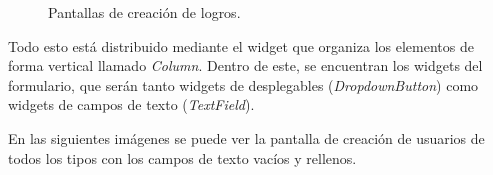 \begin{figure}[H]%
  \centering
  \qquad
  \caption{Pantallas de creación de logros.}%
  \label{fig:creacion_logros}%
\end{figure}

\newpage

Todo esto está distribuido mediante el widget que organiza los elementos de forma vertical llamado \textit{Column}. Dentro de este, se encuentran los widgets del formulario, que serán tanto widgets de desplegables (\textit{DropdownButton}) como widgets de campos de texto (\textit{TextField}).

En las siguientes imágenes se puede ver la pantalla de creación de usuarios de todos los tipos con los campos de texto vacíos y rellenos.






